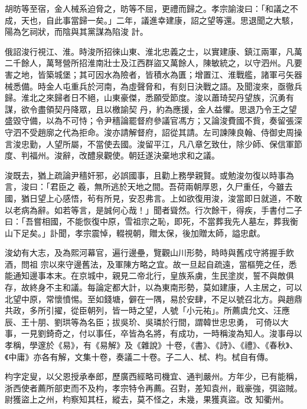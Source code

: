 \begin{pinyinscope}
 胡昉等至宿，金人械系迫脅之，昉等不屈，更禮而歸之。孝宗諭浚曰：「和議之不成，天也，自此事當歸一矣。」二年，議進幸建康，詔之望等還。思退聞之大駭，陽為乞祠狀，而陰與其黨謀為陷浚
 計。



 俄詔浚行視江、淮。時浚所招徠山東、淮北忠義之士，以實建康、鎮江兩軍，凡萬二千餘人，萬弩營所招淮南壯士及江西群盜又萬餘人，陳敏統之，以守泗州。凡要害之地，皆築城堡；其可因水為險者，皆積水為匱；增置江、淮戰艦，諸軍弓矢器械悉備。時金人屯重兵於河南，為虛聲脅和，有刻日決戰之語。及聞浚來，亟徹兵歸。淮北之來歸者日不絕，山東豪傑，悉願受節度。浚以蕭琦契丹望族，沉勇有謀，欲令盡領契丹降眾，且以檄諭契
 丹，約為應援，金人益懼。思退乃令王之望盛毀守備，以為不可恃；令尹穡論罷督府參議官馮方；又論浚費國不貲，奏留張深守泗不受趙廓之代為拒命。浚亦請解督府，詔從其請。左司諫陳良翰、侍御史周操言浚忠勤，人望所屬，不當使去國。浚留平江，凡八章乞致仕，除少師、保信軍節度、判福州。浚辭，改醴泉觀使。朝廷遂決棄地求和之議。



 浚既去，猶上疏論尹穡奸邪，必誤國事，且勸上務學親賢。或勉浚勿復以時事為言，浚曰：「君臣之
 羲，無所逃於天地之間。吾荷兩朝厚恩，久尸重任，今雖去國，猶日望上心感悟，茍有所見，安忍弗言。上如欲復用浚，浚當即日就道，不敢以老病為辭。如若等言，是誠何心哉！」聞者聳然。行次餘干，得疾，手書付二子曰：「吾嘗相國，不能恢復中原，雪祖宗之恥，即死，不當葬我先人墓左，葬我衡山下足矣。」訃聞，孝宗震悼，輟視朝，贈太保，後加贈太師，謚忠獻。



 浚幼有大志，及為熙河幕官，遍行邊壘，覽觀山川形勢，時時與舊戍守將握手飲酒，問祖
 宗以來守邊舊法，及軍陳方略之宜。故一旦起自疏遠，當樞筦之任，悉能通知邊事本末。在京城中，親見二帝北行，皇族系虜，生民塗炭，誓不與敵俱存，故終身不主和議。每論定都大計，以為東南形勢，莫如建康，人主居之，可以北望中原，常懷憤惕。至如錢塘，僻在一隅，易於安肆，不足以號召北方。與趙鼎共政，多所引擢，從臣朝列，皆一時之望，人號「小元祐」。所薦虞允文、汪應辰、王十朋、劉珙等為名臣；拔吳玠、吳璘於行間，謂韓世忠忠勇，
 可倚以大事，一見劉錡奇之，付以事任，卒皆為名將，有成功，一時稱浚為知人。浚事母以孝稱，學邃於《易》，有《易解》及《雜說》十卷，《書》、《詩》、《禮》、《春秋》、《中庸》亦各有解，文集十卷，奏議二十卷。子二人、栻、枃。栻自有傳。



 枃字定叟，以父恩授承奉郎，歷廣西經略司機宜、通判嚴州。方年少，已有能稱，浙西使者薦所部吏而不及枃，孝宗特令再薦。召對，差知袁州，戢豪強，弭盜賊。尉獲盜上之州，枃察知其枉，縱去，莫不怪之，未幾，果獲真盜。改
 知衢州。




\end{pinyinscope}
